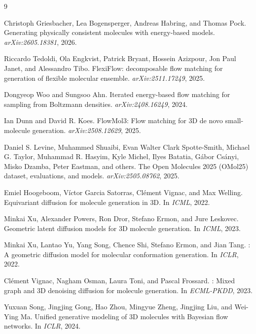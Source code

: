 \documentclass{article}
\begin{document}
\begin{thebibliography}{9}

Christoph Griesbacher, Lea Bogensperger, Andreas Habring, and Thomas Pock.
\newblock Generating physically consistent molecules with energy-based models.
\newblock \emph{arXiv:2605.18381}, 2026.

Riccardo Tedoldi, Ola Engkvist, Patrick Bryant, Hossein Azizpour, Jon Paul Janet, and Alessandro Tibo.
\newblock FlexiFlow: decomposable flow matching for generation of flexible molecular ensemble.
\newblock \emph{arXiv:2511.17249}, 2025.

Dongyeop Woo and Sungsoo Ahn.
\newblock Iterated energy-based flow matching for sampling from Boltzmann densities.
\newblock \emph{arXiv:2408.16249}, 2024.

Ian Dunn and David R. Koes.
\newblock FlowMol3: Flow matching for 3D de novo small-molecule generation.
\newblock \emph{arXiv:2508.12629}, 2025.

Daniel S. Levine, Muhammed Shuaibi, Evan Walter Clark Spotte-Smith, Michael G. Taylor, Muhammad R. Hasyim, Kyle Michel, Ilyes Batatia, G\'abor Cs\'anyi, Misko Dzamba, Peter Eastman, and others.
\newblock The Open Molecules 2025 (OMol25) dataset, evaluations, and models.
\newblock \emph{arXiv:2505.08762}, 2025.

Emiel Hoogeboom, V\'ictor Garcia Satorras, Cl\'ement Vignac, and Max Welling.
\newblock Equivariant diffusion for molecule generation in {3D}.
\newblock In \emph{ICML}, 2022.

Minkai Xu, Alexander Powers, Ron Dror, Stefano Ermon, and Jure Leskovec.
\newblock Geometric latent diffusion models for {3D} molecule generation.
\newblock In \emph{ICML}, 2023.

Minkai Xu, Lantao Yu, Yang Song, Chence Shi, Stefano Ermon, and Jian Tang.
: A geometric diffusion model for molecular conformation generation.
\newblock In \emph{ICLR}, 2022.

Cl\'ement Vignac, Nagham Osman, Laura Toni, and Pascal Frossard.
: Mixed graph and {3D} denoising diffusion for molecule generation.
\newblock In \emph{ECML-PKDD}, 2023.

Yuxuan Song, Jingjing Gong, Hao Zhou, Mingyue Zheng, Jingjing Liu, and Wei-Ying Ma.
\newblock Unified generative modeling of {3D} molecules with Bayesian flow networks.
\newblock In \emph{ICLR}, 2024.


\end{thebibliography}
\end{document}
